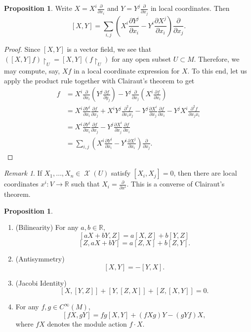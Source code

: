 \documentclass[10pt,letterpaper,cm]{nupset}
\theoremstyle{definition}
\theoremstyle{theorem}
\newtheorem{prop}[definition]{Proposition}
\theoremstyle{remark}
\newtheorem{remark}[definition]{Remark}
\newcommand{\R}{\mathbb R}
\newcommand{\1}{\mathbf{1}}
\newcommand{\0}{\vec 0}
\DeclareMathOperator{\vf}{\mathscr{X}}
\begin{document}
\begin{prop}
Write $X = X^i\frac{\partial}{\partial{x_i}}$ and $Y = Y^j \frac{\partial}{\partial{x_j}}$ in local coordinates. Then $$[X, Y] = \sum_{i, j}\left(X^i \frac{\partial{Y^j}}{\partial{x_i}} - Y^i\frac{\partial{X^j}}{\partial{x_i}}\right)\frac{\partial}{\partial{x_j}}.$$
\end{prop}
\begin{proof}
Since $[X, Y]$ is a vector field, we see that $\left([X, Y]f\right) \restriction_U = [X, Y](f\restriction_U)$ for any open subset $U \subset M$. Therefore, we may compute, say, $Xf$ in a local coordinate expression for $X$.  To this end, let us apply the product rule together with Clairaut's theorem to get
\begin{align*}
[X, Y]f & = X^i \frac{\partial}{\partial{x_i}} \left(Y^j \frac{\partial{f}}{\partial{y_j}}\right) - Y^j \frac{\partial}{\partial{x_j}} \left(X^i \frac{\partial{f}}{\partial{x_i}}\right) 
\\ & =  X^i \frac{\partial{Y^j}}{\partial{x_i}}\frac{\partial{f}}{\partial{x_j}} + X^i Y^j \frac{\partial^2{f}}{\partial{x_i}{x_j}} - Y^j \frac{\partial{X^i}}{\partial{x_j}}\frac{\partial{f}}{\partial{x_i}} - Y^j X^i \frac{\partial^2{f}}{\partial{x_j}{x_i}}
 \\ & = X^i \frac{\partial{Y^j}}{\partial{x_i}}\frac{\partial{f}}{\partial{x_j}} -  Y^j \frac{\partial{X^i}}{\partial{x_j}}\frac{\partial{f}}{\partial{x_i}} 
 \\ & = \sum_{i, j}\left(X^i \frac{\partial{Y^j}}{\partial{x_i}} - Y^i\frac{\partial{X^j}}{\partial{x_i}}\right)\frac{\partial}{\partial{x_j}}.
 \end{align*}
\end{proof}

\begin{remark}
If $X_1, \ldots, X_n \in \vf(U)$ satisfy $[X_i, X_j]= 0$, then there are local coordinates $x^i : V \to \R$ such that $X_i  =\frac{\partial}{\partial{x^i}}$. This is a converse of Clairaut's theorem.
\end{remark}

\begin{prop} $ $
\begin{enumerate}
\item (Bilinearity) For any $a,b \in \R$, $$[aX + bY, Z] = a[X, Z] + b[Y, Z]$$ $$[Z, aX + bY] = a[Z, X] + b[Z, Y]. $$ 
\item (Antisymmetry) $$[X, Y] = {-[Y,X]}.$$
\item (Jacobi Identity) $$\left[X, [Y, Z]\right]+ \left[Y, [Z, X]\right] + \left[Z, [X, Y]\right] =0  . $$
\item For any $f, g \in C^{\infty}(M)$, $$[fX, gY] = fg[X, Y] + \left(fXg\right)Y - \left(gYf\right)X, $$ where $fX$ denotes the module action $f \cdot X$.
\end{enumerate}
\end{prop}
\end{document}
